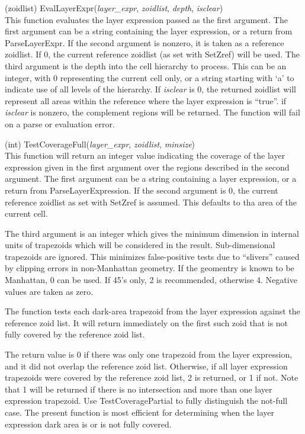 \begin{description}
\item{(zoidlist) \vt EvalLayerExpr({\it layer\_expr}, {\it zoidlist},
  {\it depth}, {\it isclear\/})}\\
This function evaluates the layer expression passed as the first
argument.  The first argument can be a string containing the layer
expression, or a return from {\vt ParseLayerExpr}.  If the
second argument is nonzero, it is taken as a reference zoidlist.  If
0, the current reference zoidlist (as set with {\vt SetZref}) will be
used.  The third argument is the depth into the cell hierarchy to
process.  This can be an integer, with 0 representing the current cell
only, or a string starting with `{\vt a}' to indicate use of all
levels of the hierarchy.  If {\it isclear} is 0, the returned zoidlist
will represent all areas within the reference where the layer
expression is ``true''.  if {\it isclear} is nonzero, the complement
regions will be returned.  The function will fail on a parse or
evaluation error.

\item{(int) \vt TestCoverageFull({\it layer\_expr}, {\it zoidlist},
  {\it minsize\/})}\\
This function will return an integer value indicating the coverage of
the layer expression given in the first argument over the regions
described in the second argument.  The first argument can be a string
containing a layer expression, or a return from {\vt
ParseLayerExpression}.  If the second argument is 0, the current
reference zoidlist as set with {\vt SetZref} is assumed.  This
defaults to tha area of the current cell.

The third argument is an integer which gives the minimum dimension in
internal units of trapezoids which will be considered in the result. 
Sub-dimensional trapezoids are ignored.  This minimizes false-positive
tests due to ``slivers'' caused by clipping errors in non-Manhattan
geometry.  If the geomentry is known to be Manhattan, 0 can be used. 
If 45's only, 2 is recommended, otherwise 4.  Negative values are
taken as zero.

The function tests each dark-area trapezoid from the layer expression
against the reference zoid list.  It will return immediately on the
first such zoid that is not fully covered by the reference zoid list.

The return value is 0 if there was only one trapezoid from the layer
expression, and it did not overlap the reference zoid list. 
Otherwise, if all layer expression trapezoids were covered by the
reference zoid list, 2 is returned, or 1 if not.  Note that 1 will be
returned if there is no intersection and more than one layer
expression trapezoid.  Use {\vt TestCoveragePartial} to fully
distinguish the not-full case.  The present function is most efficient
for determining when the layer expression dark area is or is not fully
covered.


\end{description}
